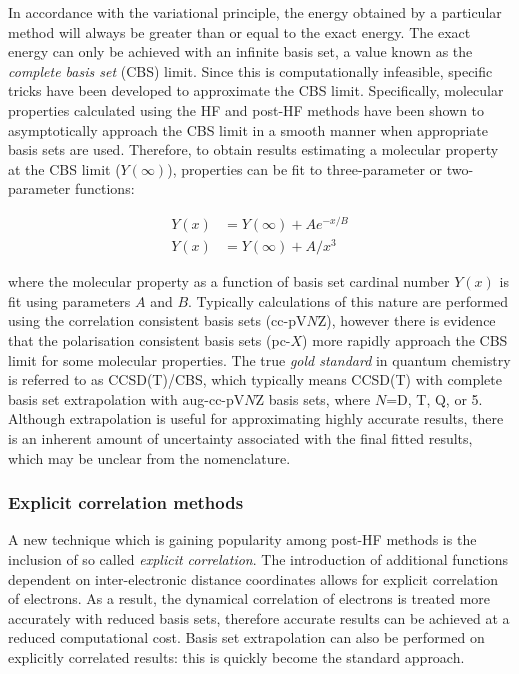 In accordance with the variational principle, the energy obtained by a
particular method will always be greater than or equal to the exact energy. The
exact energy can only be achieved with an infinite basis set, a value known as
the \emph{complete basis set} (CBS) limit.\cite{Truhlar1998} Since this is
computationally infeasible, specific tricks have been developed to approximate
the CBS limit. Specifically, molecular properties calculated using the HF and
post-HF methods have been shown to asymptotically approach the CBS limit in a
smooth manner when appropriate basis sets are used. Therefore, to obtain results
estimating a molecular property at the CBS limit ($Y(\infty)$), properties can
be fit to three-parameter\cite{Feller1992,Feller1993} or two-parameter
functions:\cite{Helgaker1997,Halkier1998}

\begin{align}
  Y(x) &= Y(\infty) + Ae^{-x/B} \\
  Y(x) &= Y(\infty) + A/x^3
\end{align}

\noindent where the molecular property as a function of basis set cardinal
number $Y(x)$ is fit using parameters $A$ and $B$. Typically calculations of
this nature are performed using the correlation consistent basis sets
(cc-pV$N$Z), however there is evidence that the polarisation consistent basis
sets (pc-$X$) more rapidly approach the CBS limit for some molecular
properties.\cite{Kupka2007} The true \emph{gold standard} in quantum chemistry
is referred to as CCSD(T)/CBS, which typically means CCSD(T) with complete basis
set extrapolation with aug-cc-pV$N$Z basis sets, where $N$=D, T, Q, or
5. Although extrapolation is useful for approximating highly accurate results,
there is an inherent amount of uncertainty associated with the final fitted
results, which may be unclear from the nomenclature.

\subsubsection{Explicit correlation methods}

A new technique which is gaining popularity among post-HF methods is the
inclusion of so called \emph{explicit correlation}.\cite{Shiozaki2008,Kohn2008}
The introduction of additional functions dependent on inter-electronic distance
coordinates allows for explicit correlation of electrons.\cite{Tenno2012} As a
result, the dynamical correlation of electrons is treated more accurately with
reduced basis sets, therefore accurate results can be achieved at a reduced
computational cost. Basis set extrapolation can also be performed on explicitly
correlated results: this is quickly become the standard
approach.\cite{Feller2013}



